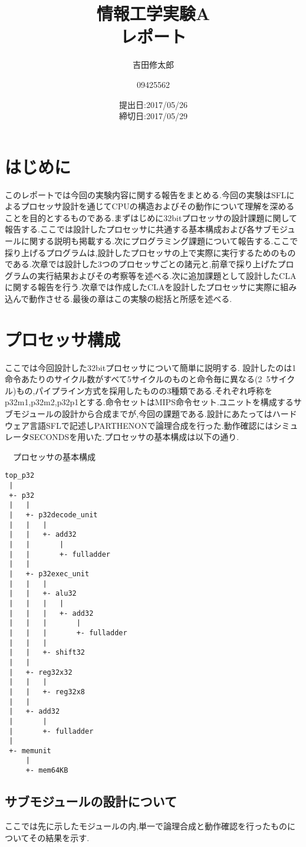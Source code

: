 \documentclass[11pt,a4j]{jarticle}
\title{情報工学実験A \\ 
       レポート
}
\author{吉田修太郎 \and 09425562}
\date{提出日:2017/05/26 \\
      締切日:2017/05/29
}
\begin{document}
\maketitle
\section{はじめに}
このレポートでは今回の実験内容に関する報告をまとめる.今回の実験はSFLによるプロセッサ設計を通じてCPUの構造およびその動作について理解を深めることを目的とするものである.まずはじめに32bitプロセッサの設計課題に関して報告する.ここでは設計したプロセッサに共通する基本構成および各サブモジュールに関する説明も掲載する.次にプログラミング課題について報告する.ここで採り上げるプログラムは,設計したプロセッサの上で実際に実行するためのものである.次章では設計した3つのプロセッサごとの諸元と,前章で採り上げたプログラムの実行結果およびその考察等を述べる.次に追加課題として設計したCLAに関する報告を行う.次章では作成したCLAを設計したプロセッサに実際に組み込んで動作させる.最後の章はこの実験の総括と所感を述べる.
\section{プロセッサ構成}
ここでは今回設計した32bitプロセッサについて簡単に説明する.
設計したのは1命令あたりのサイクル数がすべて5サイクルのものと命令毎に異なる(2~5サイクル)もの,パイプライン方式を採用したものの3種類である.それぞれ呼称をp32m1,p32m2,p32p1とする.命令セットはMIPS命令セット.ユニットを構成するサブモジュールの設計から合成までが,今回の課題である.設計にあたってはハードウェア言語SFLで記述しPARTHENONで論理合成を行った.動作確認にはシミュレータSECONDSを用いた.プロセッサの基本構成は以下の通り.\\ \newpage
{\scriptsize
　プロセッサの基本構成
\begin{verbatim}
top_p32
 |
 +- p32
 |   |
 |   +- p32decode_unit
 |   |   |
 |   |   +- add32
 |   |       |
 |   |       +- fulladder
 |   |
 |   +- p32exec_unit
 |   |   |
 |   |   +- alu32
 |   |   |   |
 |   |   |   +- add32
 |   |   |       |
 |   |   |       +- fulladder
 |   |   |
 |   |   +- shift32
 |   |
 |   +- reg32x32
 |   |   |
 |   |   +- reg32x8
 |   |
 |   +- add32
 |       |
 |       +- fulladder
 |
 +- memunit
     |
     +- mem64KB
\end{verbatim}
}
\subsection{サブモジュールの設計について}
ここでは先に示したモジュールの内,単一で論理合成と動作確認を行ったものについてその結果を示す.
\end{document}
